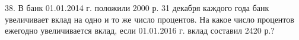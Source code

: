 38. В банк 01.01.2014 г. положили 2000 р. 31 декабря каждого года банк увеличивает вклад на одно и то же число процентов. На какое число процентов ежегодно увеличивается вклад, если 01.01.2016 г. вклад составил 2420 р.?\\
